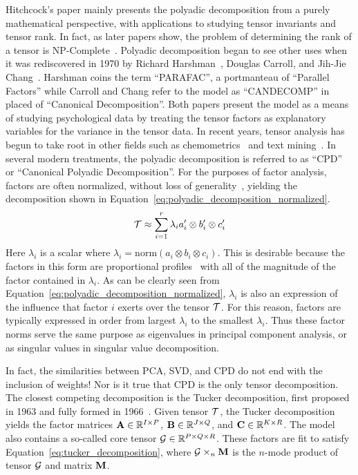 \documentclass[../ut-dissertation.tex]{subfiles}
\begin{document}
Hitchcock's paper mainly presents the polyadic decomposition from a
purely mathematical perspective, with applications to studying tensor
invariants and tensor rank.  In fact, as later papers show, the
problem of determining the rank of a tensor is
NP-Complete~\cite{haastad1990}.  Polyadic decomposition began to see
other uses when it was rediscovered in 1970 by Richard
Harshman~\cite{harshman1970}, Douglas Carroll, and Jih-Jie
Chang~\cite{carroll1970}.  Harshman coins the term ``PARAFAC'', a
portmanteau of ``Parallel Factors'' while Carroll and Chang refer to
the model as ``CANDECOMP'' in placed of ``Canonical Decomposition''.
Both papers present the model as a means of studying psychological
data by treating the tensor factors as explanatory variables for the
variance in the tensor data.  In recent years, tensor analysis has
begun to take root in other fields such as chemometrics~\cite{bro1997}
and text mining~\cite{bader2007}.  In several modern treatments, the
polyadic decomposition is referred to as ``CPD'' or ``Canonical
Polyadic Decomposition''.  For the purposes of factor analysis,
factors are often normalized, without loss of
generality~\cite{bro1997, bader2007}, yielding the decomposition shown
in Equation~\ref{eq:polyadic_decomposition_normalized}.
\begin{equation} \label{eq:polyadic_decomposition_normalized}
  \mathcal{T} \approx \displaystyle\sum_{i=1}^{r} \lambda_i a'_i
  \otimes b'_i \otimes c'_i
\end{equation}
Here $\lambda_i$ is a scalar where $\lambda_i = \mathrm{norm}(a_i
\otimes b_i \otimes c_i)$.  This is desirable because the factors in
this form are proportional profiles~\cite{harshman1970} with all of
the magnitude of the factor contained in $\lambda_i$.  As can be
clearly seen from Equation~\ref{eq:polyadic_decomposition_normalized},
$\lambda_i$ is also an expression of the influence that factor $i$
exerts over the tensor $\mathcal{T}$.  For this reason, factors are
typically expressed in order from largest $\lambda_i$ to the smallest
$\lambda_i$.  Thus these factor norms serve the same purpose as
eigenvalues in principal component analysis, or as singular values in
singular value decomposition.

In fact, the similarities between PCA, SVD, and CPD do not end with
the inclusion of weights!  Nor is it true that CPD is the only tensor
decomposition.  The closest competing decomposition is the Tucker
decomposition, first proposed in 1963 and fully formed in
1966~\cite{kolda2009}.  Given tensor $\mathcal{T}$, the Tucker
decomposition yields the factor matrices $\mathrm{\bf 
  A}\in\mathbb{R}^{I\times P}$, $\mathrm{\bf  B} \in
\mathbb{R}^{J\times Q}$, and $\mathrm{\bf  C}\in
\mathbb{R}^{K\times R}$.  The model also contains a so-called core
tensor $\mathcal{G} \in \mathbb{R}^{P\times Q \times R}$.  These
factors are fit to satisfy Equation~\ref{eq:tucker_decomposition},
where $\mathcal{G} \times_n \mathrm{\bf M}$ is the $n$-mode product of
tensor $\mathcal{G}$ and matrix $\mathrm{\bf M}$.  
\end{document}
